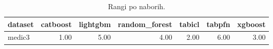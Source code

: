 \begin{table}[htbp]
\centering
\caption{Rangi po naborih.}
\label{tab:ranks}
\begin{tabular}{lrrrrrr}
\hline
dataset & catboost & lightgbm & random\_forest & tabicl & tabpfn & xgboost \\
\hline
medic3 & 1.00 & 5.00 & 4.00 & 2.00 & 6.00 & 3.00 \\
\hline
\end{tabular}
\end{table}
